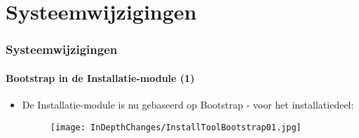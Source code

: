 %

\section{Systeemwijzigingen}


\begin{frame}[fragile]
	\frametitle{Systeemwijzigingen}
	\framesubtitle{Bootstrap in de Installatie-module (1)}

	\begin{itemize}

		\item De Installatie-module is nu gebaseerd op Bootstrap - voor het installatiedeel:

			\begin{figure}
				\texttt{[image: InDepthChanges/InstallToolBootstrap01.jpg]}
			\end{figure}

	\end{itemize}

\end{frame}


